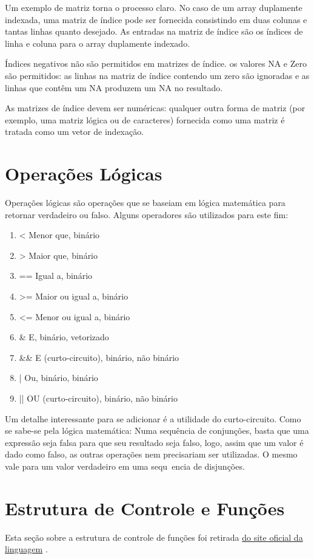       Um exemplo de matriz torna o processo claro. No caso de um array duplamente indexada, uma matriz de índice pode ser fornecida consistindo em duas colunas e tantas linhas quanto desejado. As entradas na matriz de índice são os índices de linha e coluna para o array duplamente indexado. 

      Índices negativos não são permitidos em matrizes de índice. os valores NA e Zero são permitidos: as linhas na matriz de índice contendo um zero são ignoradas e as linhas que contêm um NA produzem um NA no resultado.

      As matrizes de índice devem ser numéricas: qualquer outra forma de matriz (por exemplo, uma matriz lógica ou de caracteres) fornecida como uma matriz é tratada como um vetor de indexação.
  \section{Operações Lógicas}
    Operações lógicas são operações que se baseiam em lógica matemática para retornar verdadeiro ou falso. Alguns operadores são utilizados para este fim:
    \begin{enumerate}
      \item  <    Menor que, binário
      \item  >    Maior que, binário
      \item  ==    Igual a, binário
      \item  >=    Maior ou igual a, binário
      \item  <=    Menor ou igual a, binário
      \item  \&    E, binário, vetorizado
      \item  \&\&    E (curto-circuito), binário, não binário
      \item  |    Ou, binário, binário
      \item  ||    OU (curto-circuito), binário, não binário
    \end{enumerate}

    Um detalhe interessante para se adicionar é a utilidade do curto-circuito. Como se sabe-se pela lógica matemática: Numa sequência de conjunções, basta que uma expressão seja falsa para que seu resultado seja falso, logo, assim que um valor é dado como falso, as outras operações nem precisariam ser utilizadas. O mesmo vale para um valor verdadeiro em uma sequ~encia de disjunções.\textbf{}
  \section{Estrutura de Controle e Funções}
  	Esta seção sobre a estrutura de controle de funções foi retirada 
  	\href{https://cran.r-project.org/doc/manuals/r-release/R-lang.html#Constants}{do site oficial da linguagem} \cite{Team2021b}.
